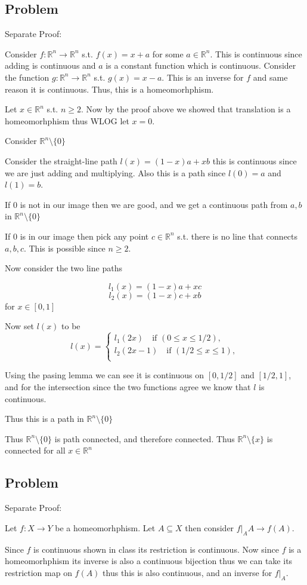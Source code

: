 \documentclass[12pt, letterpaper]{article}
\newcounter{problem}
\newcommand{\q}{
    \newpage %
    \stepcounter{problem} %
    \subsection*{Problem \arabic{problem}} %
}
\newcommand{\R}{\mathbb{R}}
\renewcommand{\t}[1]{\text{#1}}
\begin{document}
\q
Separate Proof:

Consider $f: \R^n \to \R^n$ s.t. $f(x)=x+a$ for some $a \in \R^n$. This is continuous since adding is continuous and $a$ is a constant function which is continuous. Consider the function $g: \R^n \to \R^n$ s.t. $g(x)=x-a$. This is an inverse for $f$ and same reason it is continuous. Thus, this is a homeomorhphism.

Let $x \in \R^n$ s.t. $n \geq 2$. Now by the proof above we showed that translation is a homeomorhphism thus WLOG let $x=0$.

Consider $\R^n \setminus \{0\}$

Consider the straight-line path $l(x)=(1-x)a+xb$ this is continuous since we are just adding and multiplying. Also this is a path since $l(0)=a$ and $l(1)=b$.

If $0$ is not in our image then we are good, and we get a continuous path from $a,b$ in $\R^n \setminus \{0\}$

If $0$ is in our image then pick any point $c \in \R^n$ s.t. there is no line that connects $a,b,c$. This is possible since $n \geq 2$.

Now consider the two line paths

\[l_1(x)=(1-x)a+xc\]
\[l_2(x)=(1-x)c+xb\]
for $x\in [0,1]$

Now set $l(x)$ to be
\begin{equation*}
    l(x)=\begin{cases*}
        l_1(2x) \quad \t{if } (0 \leq x \leq 1/2),\\
        l_2(2x-1) \quad \t{if } (1/2 \leq x \leq 1),\\
    \end{cases*}
\end{equation*}

Using the pasing lemma we can see it is continuous on $[0,1/2]$ and $[1/2,1]$, and for the intersection since the two functions agree we know that $l$ is continuous.

Thus this is a path in $\R^n \setminus \{0\}$

Thus $\R^n \setminus \{0\}$ is path connected, and therefore connected. Thus $\R^n \setminus \{x\}$ is connected for all $x \in \R^n$

\q

Separate Proof:

Let $f: X \to Y$ be a homeomorhphism. Let $A \subseteq X$ then consider $f\vert_{A} A \to f(A)$.

Since $f$ is continuous shown in class its restriction is continuous. Now since $f$ is a homeomorhphism its inverse is also a continuous bijection thus we can take its restriction map on $f(A)$ thus this is also continuous, and an inverse for $f\vert_A$.
\end{document}
